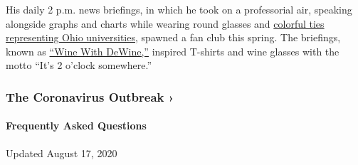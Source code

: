 His daily 2 p.m. news briefings, in which he took on a professorial air,
speaking alongside graphs and charts while wearing round glasses and
\href{https://twitter.com/GovMikeDeWine/status/1247586451623227394?s=20}{colorful
ties representing Ohio universities}, spawned a fan club this spring.
The briefings, known as
\href{https://www.cleveland.com/opinion/2020/05/wine-with-dewine-an-indispensable-refuge-in-our-day.html}{``Wine
With DeWine,''} inspired T-shirts and wine glasses with the motto ``It's
2 o'clock somewhere.''

\href{https://www.nytimes3xbfgragh.onion/news-event/coronavirus?action=click\&pgtype=Article\&state=default\&region=MAIN_CONTENT_3\&context=storylines_faq}{}

\hypertarget{the-coronavirus-outbreak-}{%
\subsubsection{The Coronavirus Outbreak
›}\label{the-coronavirus-outbreak-}}

\hypertarget{frequently-asked-questions}{%
\paragraph{Frequently Asked
Questions}\label{frequently-asked-questions}}

Updated August 17, 2020

